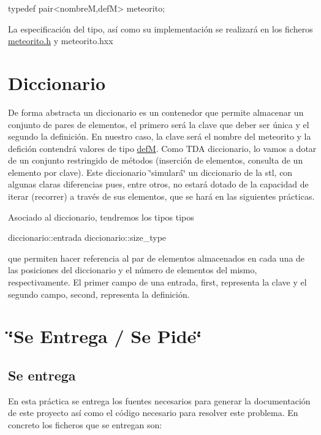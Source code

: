 \begin{DoxyCode}
typedef pair<nombreM,defM> meteorito; 
\end{DoxyCode}


\-La especificación del tipo, así como su implementación se realizará en los ficheros \hyperlink{meteorito_8h_source}{meteorito.\-h} y meteorito.\-hxx\hypertarget{index_dicc}{}\section{\-Diccionario}\label{index_dicc}
\-De forma abstracta un diccionario es un contenedor que permite almacenar un conjunto de pares de elementos, el primero será la clave que deber ser única y el segundo la definición. \-En nuestro caso, la clave será el nombre del meteorito y la defición contendrá valores de tipo \hyperlink{classdefM}{def\-M}. \-Como \-T\-D\-A diccionario, lo vamos a dotar de un conjunto restringido de métodos (inserción de elementos, consulta de un elemento por clave). \-Este diccionario \char`\"{}simulará\char`\"{} un diccionario de la stl, con algunas claras diferencias pues, entre otros, no estará dotado de la capacidad de iterar (recorrer) a través de sus elementos, que se hará en las siguientes prácticas.

\-Asociado al diccionario, tendremos los tipos tipos 
\begin{DoxyCode}
diccionario::entrada
diccionario::size_type
\end{DoxyCode}
 que permiten hacer referencia al par de elementos almacenados en cada una de las posiciones del diccionario y el número de elementos del mismo, respectivamente. \-El primer campo de una entrada, first, representa la clave y el segundo campo, second, representa la definición.\hypertarget{index_sec_tar}{}\section{\char`\"{}\-Se Entrega / Se Pide\char`\"{}}\label{index_sec_tar}
\hypertarget{index_ssEntrega}{}\subsection{\-Se entrega}\label{index_ssEntrega}
\-En esta práctica se entrega los fuentes necesarios para generar la documentación de este proyecto así como el código necesario para resolver este problema. \-En concreto los ficheros que se entregan son\-:

